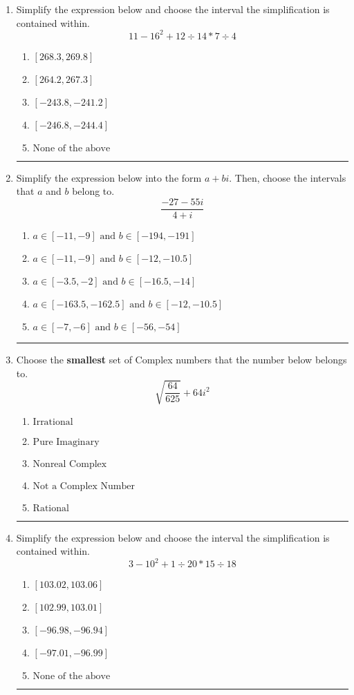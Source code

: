 \documentclass[14pt]{extbook}
\newcommand{\litem}[1]{\item#1\hspace*{-1cm}\rule{\textwidth}{0.4pt}}
\begin{document}
\begin{enumerate}
{\begin{enumerate}[label=\Alph*.]
\end{enumerate} }
\litem{
Simplify the expression below and choose the interval the simplification is contained within.\[ 11 - 16^2 + 12 \div 14 * 7 \div 4 \]\begin{enumerate}[label=\Alph*.]
\item \( [268.3, 269.8] \)
\item \( [264.2, 267.3] \)
\item \( [-243.8, -241.2] \)
\item \( [-246.8, -244.4] \)
\item \( \text{None of the above} \)

\end{enumerate} }
\litem{
Simplify the expression below into the form $a+bi$. Then, choose the intervals that $a$ and $b$ belong to.\[ \frac{-27 - 55 i}{4 + i} \]\begin{enumerate}[label=\Alph*.]
\item \( a \in [-11, -9] \text{ and } b \in [-194, -191] \)
\item \( a \in [-11, -9] \text{ and } b \in [-12, -10.5] \)
\item \( a \in [-3.5, -2] \text{ and } b \in [-16.5, -14] \)
\item \( a \in [-163.5, -162.5] \text{ and } b \in [-12, -10.5] \)
\item \( a \in [-7, -6] \text{ and } b \in [-56, -54] \)

\end{enumerate} }
\litem{
Choose the \textbf{smallest} set of Complex numbers that the number below belongs to.\[ \sqrt{\frac{64}{625}} + 64i^2 \]\begin{enumerate}[label=\Alph*.]
\item \( \text{Irrational} \)
\item \( \text{Pure Imaginary} \)
\item \( \text{Nonreal Complex} \)
\item \( \text{Not a Complex Number} \)
\item \( \text{Rational} \)

\end{enumerate} }
\litem{
Simplify the expression below and choose the interval the simplification is contained within.\[ 3 - 10^2 + 1 \div 20 * 15 \div 18 \]\begin{enumerate}[label=\Alph*.]
\item \( [103.02, 103.06] \)
\item \( [102.99, 103.01] \)
\item \( [-96.98, -96.94] \)
\item \( [-97.01, -96.99] \)
\item \( \text{None of the above} \)


\end{enumerate}}
\end{enumerate}
\end{document}
